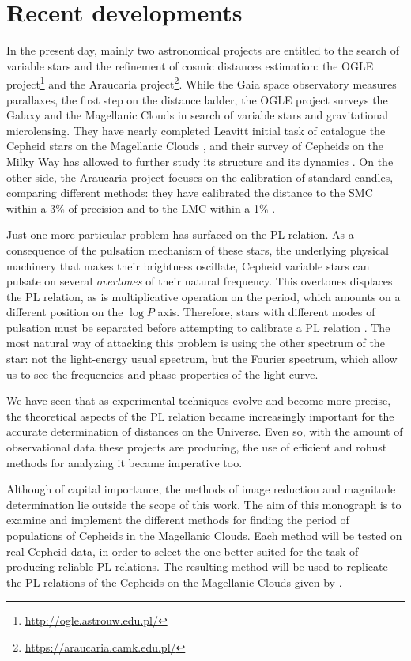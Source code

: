 \section{Recent developments}


In the present day, mainly two astronomical projects are entitled to the search of variable stars and the refinement of cosmic distances estimation:
the OGLE project\footnote{\url{http://ogle.astrouw.edu.pl/}} and the Araucaria project\footnote{\url{https://araucaria.camk.edu.pl/}}.
While the Gaia space observatory measures parallaxes, the first step on the distance ladder, 
the OGLE project surveys the Galaxy and the Magellanic Clouds in search of variable stars and gravitational microlensing.
They have nearly completed Leavitt initial task of catalogue the Cepheid stars on the Magellanic Clouds \citep{OGLE2017},
and their survey of Cepheids on the Milky Way has allowed to further study its structure \citep{Skowron2019} and its dynamics \citep{Mroz2019}.
On the other side, the Araucaria project focuses on the calibration of standard candles, comparing different methods: 
they have calibrated the distance to the SMC within a 3\% of precision \citep{Araucaria2014} and to the LMC within a 1\% \citep{Araucaria2019}.



Just one more particular problem has surfaced on the PL relation. 
As a consequence of the pulsation mechanism of these stars, 
the underlying physical machinery that makes their brightness oscillate,
Cepheid variable stars can pulsate on several \textit{overtones} of their natural frequency.
This overtones displaces the PL relation, as is multiplicative operation on the period, 
which amounts on a different position on the $\log P$ axis.
Therefore, stars with different modes of pulsation must be separated before attempting to calibrate a PL relation \citep{Zabolotski2005}.
The most natural way of attacking this problem is using the other spectrum of the star: 
not the light-energy usual spectrum, but the Fourier spectrum, 
which allow us to see the frequencies and phase properties of the light curve.

We have seen that as experimental techniques evolve and become more precise, 
the theoretical aspects of the PL relation became increasingly important for the accurate determination of distances on the Universe.
Even so, with the amount of observational data these projects are producing, 
the use of efficient and robust methods for analyzing it became imperative too.

Although of capital importance, the methods of image reduction and magnitude determination lie outside the scope of this work.
The aim of this monograph is to examine and implement the different methods for finding the period of populations of Cepheids in the Magellanic Clouds.
Each method will be tested on real Cepheid data, in order to select the one better suited for the task of producing reliable PL relations.
The resulting method will be used to replicate the PL relations of the Cepheids on the Magellanic Clouds given by \cite{OGLE2016}.



